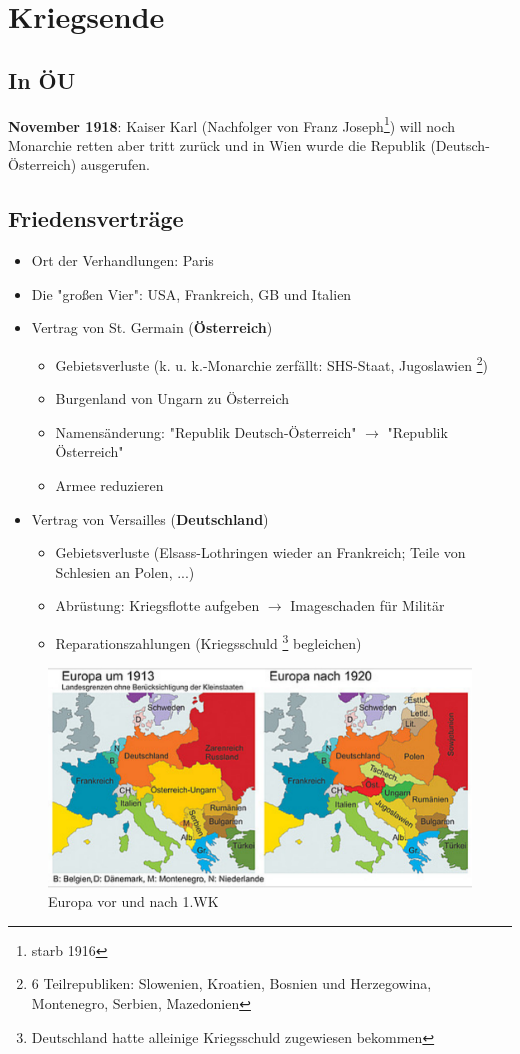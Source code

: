 \documentclass[a4paper, ngerman]{article}
\begin{document}
\section*{Kriegsende}
\subsection*{In ÖU}
\textbf{November 1918}: Kaiser Karl (Nachfolger von Franz Joseph\footnote{starb 1916}) will noch Monarchie retten aber tritt zurück und in Wien wurde die
Republik (Deutsch-Österreich) ausgerufen.
\subsection*{Friedensverträge}
\begin{itemize}
    \item Ort der Verhandlungen: Paris
    \item Die "großen Vier": USA, Frankreich, GB und Italien
    \item Vertrag von St. Germain (\textbf{Österreich})
          \begin{itemize}
              \item Gebietsverluste (k. u. k.-Monarchie zerfällt: SHS-Staat, Jugoslawien \footnote{6 Teilrepubliken:
                        Slowenien, Kroatien, Bosnien und Herzegowina, Montenegro, Serbien, Mazedonien})
              \item Burgenland von Ungarn zu Österreich
              \item Namensänderung: "Republik Deutsch-Österreich" $\rightarrow$ "Republik Österreich"
              \item Armee reduzieren
          \end{itemize}
    \item Vertrag von Versailles (\textbf{Deutschland})
          \begin{itemize}
              \item Gebietsverluste (Elsass-Lothringen wieder an Frankreich; Teile von Schlesien an Polen, ...)
              \item Abrüstung: Kriegsflotte aufgeben $\rightarrow$ Imageschaden für Militär
              \item Reparationszahlungen (Kriegsschuld \footnote{Deutschland hatte alleinige Kriegsschuld zugewiesen bekommen} begleichen)
          \end{itemize}
\end{itemize}

\begin{figure}[h]
    \centering
    \includegraphics[scale=0.23]{eu.png}
    \caption{Europa vor und nach 1.WK}
\end{figure}
\end{document}
